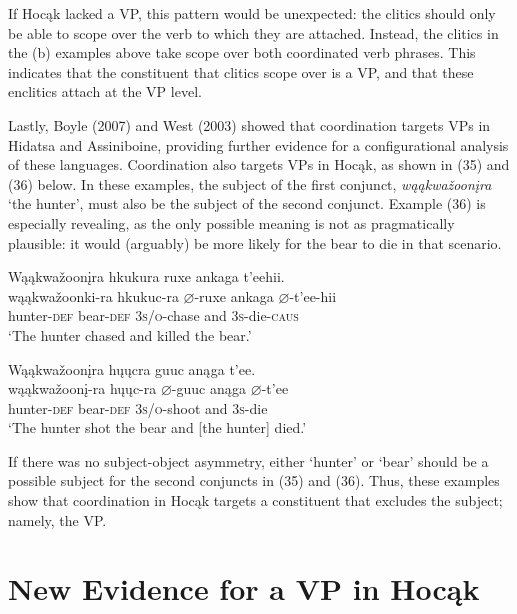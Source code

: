 \documentclass[output=paper]{LSP/langsci}
\begin{document}
If Hoc\k{a}k lacked a VP, this pattern would be unexpected: the clitics should only be able to scope over the verb to which they are attached. Instead, the clitics in the (b) examples above take scope over both coordinated verb phrases. This indicates that the constituent that clitics scope over is a VP, and that these enclitics attach at the VP level. 
	
Lastly, Boyle (2007) and West (2003) showed that coordination targets VPs in Hidatsa and Assiniboine, providing further evidence for a configurational analysis of these languages.  Coordination also targets VPs in Hoc\k{a}k, as shown in (35) and (36) below. In these examples, the subject of the first conjunct, \textit{w\k{a}\k{a}kwa\v{z}oon\k{i}ra} `the hunter', must also be the subject of the second conjunct.  Example (36) is especially revealing, as the only possible meaning is not as pragmatically plausible: it would (arguably) be more likely for the bear to die in that scenario.

\begin{exe}
\ex 
\glll W\k{a}\k{a}kwa\v{z}oon\k{i}ra 		hk{u}k{u}ra 			ruxe 				ank{a}ga 	t'eehii. \\
w\k{a}\k{a}kwa\v{z}oonk{i}-ra 	hk{u}k{u}c-ra 		$\varnothing$-ruxe  		ank{a}ga 	$\varnothing$-t'ee-hii \\
hunter-\textsc{def} 					bear-\textsc{def} 	\textsc{3s/o}-chase and 		\textsc{3s}-die-\textsc{caus} \\
\trans`The hunter chased and killed the bear.'

\ex 
\glll W\k{a}\k{a}kwa\v{z}oon\k{i}ra 		h\k{u}\k{u}cra 		guuc 				an\k{a}ga 	t'ee. \\
w\k{a}\k{a}kwa\v{z}oon\k{i}-ra 	h\k{u}\k{u}c-ra 		$\varnothing$-guuc 			an\k{a}ga 	$\varnothing$-t'ee \\
hunter-\textsc{def} 		bear-\textsc{def} 	\textsc{3s/o}-shoot 		and 		\textsc{3s}-die \\
\trans `The hunter shot the bear and [the hunter] died.'
\end{exe}
	
If there was no subject-object asymmetry, either `hunter' or `bear' should be a possible subject for the second conjuncts in (35) and (36). Thus, these examples show that coordination in Hoc\k{a}k targets a constituent that excludes the subject; namely, the VP.

\section{New Evidence for a VP in Hoc\k{a}k}
\end{document}

